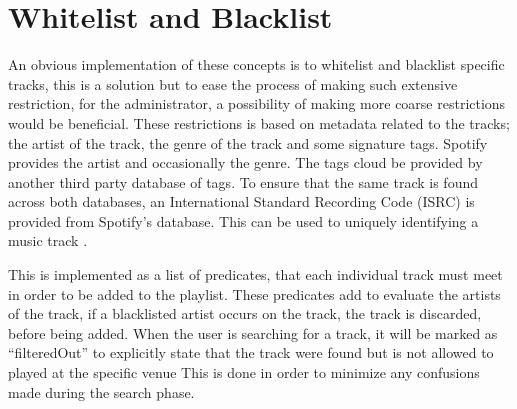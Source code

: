 \section{Whitelist and Blacklist}

An obvious implementation of these concepts is to whitelist and blacklist specific tracks, this is a solution but to ease the process of making such extensive restriction, for the administrator, a possibility of making more coarse restrictions would be beneficial. These restrictions is based on metadata related to the tracks; the artist of the track, the genre of the track and some signature tags. Spotify provides the artist and occasionally the genre. The tags cloud be provided by another third party database of tags. To ensure that the same track is found across both databases, an International Standard Recording Code (ISRC) is provided from Spotify’s database. This can be used to uniquely identifying a music track \cite{isrc}.

This is implemented as a list of predicates, that each individual track must meet in order to be added to the playlist. These predicates add to evaluate the artists of the track, if a blacklisted artist occurs on the track, the track is discarded, before being added. When the user is searching for a track, it will be marked as \enquote{filteredOut} to explicitly state that the track were found but is not allowed to played at the specific venue This is done in order to minimize any confusions made during the search phase.
